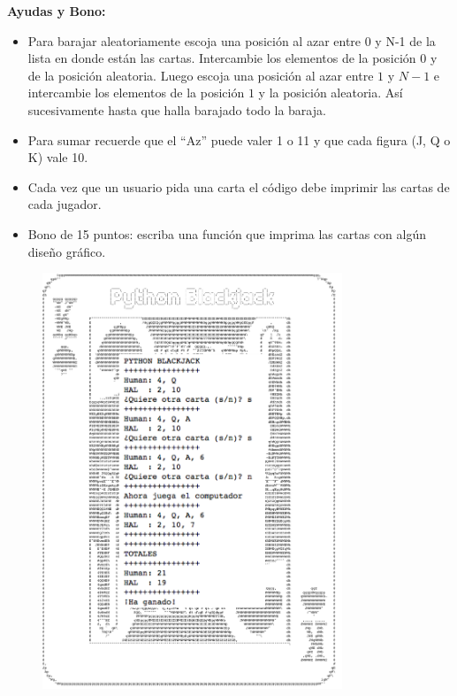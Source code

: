 \documentclass[11pt,letterpaper]{exam}
\begin{document}
\begin{questions}
\begin{parts}
\end{parts}
\vspace{1cm}
{\bf Ayudas y Bono:} 

\begin{itemize}

\item Para barajar aleatoriamente escoja una posición al azar entre 0 y N-1 de la lista en donde están las cartas.
      Intercambie los elementos de la posición $0$ y de la posición aleatoria.  Luego escoja una posición al azar
      entre $1$ y $N-1$ e intercambie los elementos de la posición $1$ y la posición aleatoria. Así sucesivamente hasta que halla barajado todo la baraja.
\item Para sumar recuerde que el ``Az'' puede valer 1 o 11 y que cada figura (J, Q o K) vale 10.
\item Cada vez que un usuario pida una carta el código debe imprimir las cartas de cada jugador. 
\item Bono de 15 puntos: escriba una función que imprima las cartas con algún diseño gráfico.

\end{itemize}

\end{questions}


\begin{figure}[h!]
\begin{center}
	\includegraphics[width=0.8\textwidth]{./pyblackj.pdf}
\end{center}
\end{figure}
\end{document}
